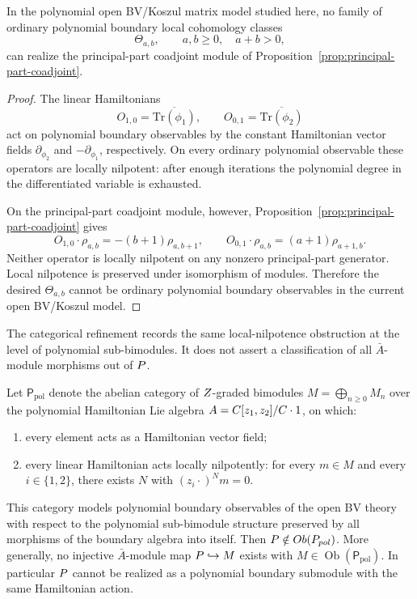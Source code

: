 \documentclass[11pt]{memoir}
\begin{document}
\begin{prop}\label{prop:no-polynomial-principal-part-boundary}
  In the polynomial open BV/Koszul matrix model studied here, no family of
  ordinary polynomial boundary local cohomology classes
  $$\Theta_{a,b},\qquad a,b\geq0,\quad a+b>0,$$
  can realize the principal-part coadjoint module of
  Proposition~\ref{prop:principal-part-coadjoint}.
\end{prop}

\begin{proof}
  The linear Hamiltonians
  $$O_{1,0}=\overline{\mathrm{Tr}(\phi_1)},\qquad
    O_{0,1}=\overline{\mathrm{Tr}(\phi_2)}$$
  act on polynomial boundary observables by the constant Hamiltonian vector
  fields $\partial_{\phi_2}$ and $-\partial_{\phi_1}$, respectively. On every
  ordinary polynomial observable these operators are locally nilpotent: after
  enough iterations the polynomial degree in the differentiated variable is
  exhausted.

  On the principal-part coadjoint module, however,
  Proposition~\ref{prop:principal-part-coadjoint} gives
  $$O_{1,0}\cdot\rho_{a,b}=-(b+1)\rho_{a,b+1},\qquad
    O_{0,1}\cdot\rho_{a,b}=(a+1)\rho_{a+1,b}.$$
  Neither operator is locally nilpotent on any nonzero principal-part
  generator. Local nilpotence is preserved under isomorphism of modules.
  Therefore the desired $\Theta_{a,b}$ cannot be ordinary polynomial boundary
  observables in the current open BV/Koszul model.
\end{proof}

The categorical refinement records the same local-nilpotence obstruction
at the level of polynomial sub-bimodules.  It does not assert a
classification of all \(\bar A\)-module morphisms out of \(P\).

\begin{thm}\label{thm:no-polynomial-realization-categorical}
  Let $\mathsf P_{\mathrm{pol}}$ denote the abelian category of
  $Z$-graded bimodules $M=\bigoplus_{n\ge0}M_n$ over the polynomial
  Hamiltonian Lie algebra $A=C[z_1,z_2]/C\cdot1$, on which:
  \begin{enumerate}
    \item every element acts as a Hamiltonian vector field;
    \item every linear Hamiltonian acts locally nilpotently: for every
      $m\in M$ and every $i\in\{1,2\}$, there exists $N$ with
      $(z_i\cdot)^N m=0$.
  \end{enumerate}
  This category models polynomial boundary observables of the open BV
  theory with respect to the polynomial sub-bimodule structure preserved
  by all morphisms of the boundary algebra into itself. Then
  $P\notin Ob(P_{pol})$.  More
  generally, no injective \(\bar A\)-module map
  \(P\hookrightarrow M\) exists with
  \(M\in\operatorname{Ob}(\mathsf P_{\mathrm{pol}})\).  In particular
  \(P\) cannot be realized as a polynomial boundary submodule with
  the same Hamiltonian action.
\end{thm}
\end{document}
